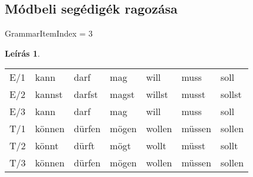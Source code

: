 \documentclass{article}
\theoremstyle{definition}
\newtheorem*{desc}{Leírás}
\begin{document}
\subsection{Módbeli segédigék ragozása}

GrammarItemIndex = 3

\begin{desc}
\begin{tabular}{lllllll}
E/1 & kann & darf & mag & will & muss & soll \\
E/2 & kannst & darfst & magst & willst & musst & sollst \\
E/3 & kann & darf & mag & will & muss & soll \\
T/1 & können & dürfen & mögen & wollen & müssen & sollen \\
T/2 & könnt & dürft & mögt & wollt & müsst & sollt \\
T/3 & können & dürfen & mögen & wollen & müssen & sollen \\
\end{tabular}
\end{desc}
\end{document}
